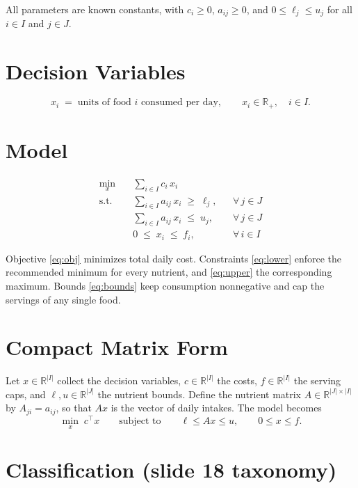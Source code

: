 \documentclass[11pt]{article}
\theoremstyle{definition}
\begin{document}
All parameters are known constants, with
$c_i \ge 0$, $a_{ij} \ge 0$, and $0 \le \ell_j \le u_j$ for all
$i \in I$ and $j \in J$.

\section{Decision Variables}

\[
  x_i \;=\; \text{units of food } i \text{ consumed per day},
  \qquad x_i \in \mathbb{R}_{+}, \quad i \in I .
\]

\section{Model}

\begin{align}
  \min_{x} \quad
    & \sum_{i \in I} c_i\, x_i
      \label{eq:obj} \\[4pt]
  \text{s.t.} \quad
    & \sum_{i \in I} a_{ij}\, x_i \;\ge\; \ell_j,
      && \forall\, j \in J
      \label{eq:lower} \\[2pt]
    & \sum_{i \in I} a_{ij}\, x_i \;\le\; u_j,
      && \forall\, j \in J
      \label{eq:upper} \\[2pt]
    & 0 \;\le\; x_i \;\le\; f_i,
      && \forall\, i \in I
      \label{eq:bounds}
\end{align}

Objective \eqref{eq:obj} minimizes total daily cost. Constraints
\eqref{eq:lower} enforce the recommended minimum for every nutrient, and
\eqref{eq:upper} the corresponding maximum. Bounds \eqref{eq:bounds}
keep consumption nonnegative and cap the servings of any single food.

\section{Compact Matrix Form}

Let $x \in \mathbb{R}^{|I|}$ collect the decision variables,
$c \in \mathbb{R}^{|I|}$ the costs, $f \in \mathbb{R}^{|I|}$ the serving
caps, and $\ell, u \in \mathbb{R}^{|J|}$ the nutrient bounds. Define the
nutrient matrix $A \in \mathbb{R}^{|J| \times |I|}$ by
$A_{ji} = a_{ij}$, so that $Ax$ is the vector of daily intakes. The
model becomes
\[
  \min_{x} \; c^{\top} x
  \qquad \text{subject to} \qquad
  \ell \le A x \le u, \qquad 0 \le x \le f .
\]

\section{Classification (slide 18 taxonomy)}
\end{document}

